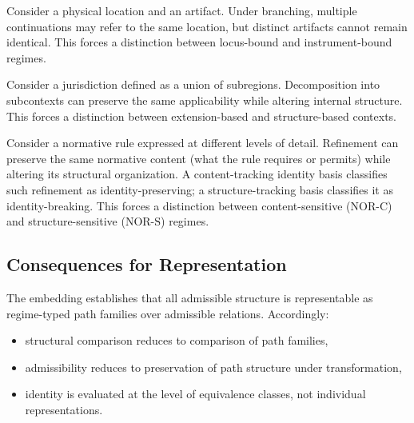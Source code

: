 \begin{description}[style=nextline,leftmargin=1.5cm]

  \item[ENR (branching)]
        Consider a physical location and an artifact.
        Under branching, multiple continuations may refer to the same location,
        but distinct artifacts cannot remain identical.
        This forces a distinction between locus-bound and instrument-bound regimes.

  \item[CTX (decomposition)]
        Consider a jurisdiction defined as a union of subregions.
        Decomposition into subcontexts can preserve the same applicability
        while altering internal structure.
        This forces a distinction between extension-based and structure-based contexts.

  \item[NOR (refinement)]
        Consider a normative rule expressed at different levels of detail.
        Refinement can preserve the same normative content
        (what the rule requires or permits)
        while altering its structural organization.
        A content-tracking identity basis classifies such refinement
        as identity-preserving; a structure-tracking basis classifies it
        as identity-breaking.
        This forces a distinction between content-sensitive ($\mathrm{NOR\mbox{-}C}$)
        and structure-sensitive ($\mathrm{NOR\mbox{-}S}$) regimes.

\end{description}

\subsection{Consequences for Representation}
\label{subsec:representation_consequences}

The embedding establishes that all admissible structure is representable
as regime-typed path families over admissible relations.
Accordingly:

\begin{itemize}
  \item structural comparison reduces to comparison of path families,
  \item admissibility reduces to preservation of path structure under transformation,
  \item identity is evaluated at the level of equivalence classes,
        not individual representations.
\end{itemize}

